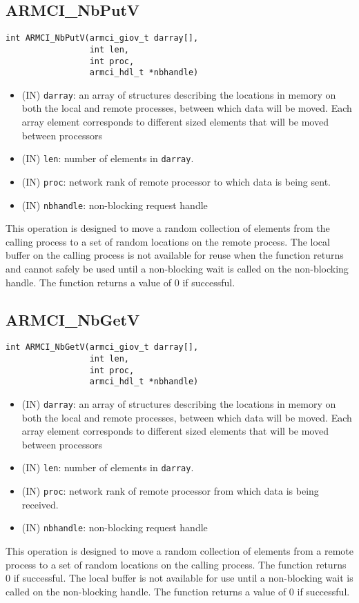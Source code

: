 \documentclass[12pt]{article}
\begin{document}
\subsection{ARMCI\_NbPutV}
\begin{verbatim}
int ARMCI_NbPutV(armci_giov_t darray[],
                 int len,
                 int proc,
                 armci_hdl_t *nbhandle)
\end{verbatim}
\begin{itemize}
\item (IN) \texttt{darray}: an array of structures describing the
locations in memory on both the local and remote processes, between which data
will be moved. Each array element corresponds to different sized elements that
will be moved between processors
\item (IN) \texttt{len}: number of elements in \texttt{darray}.
\item (IN) \texttt{proc}: network rank of remote processor to which data is
being sent.
\item (IN) \texttt{nbhandle}: non-blocking request handle
\end{itemize}
This operation is designed to move a random collection of elements from the
calling process to a set of random locations on the remote process.
The local buffer on the calling process is not available for reuse when
the function returns and cannot safely be used until a non-blocking wait is
called on the non-blocking handle. The function returns a value of 0 if
successful.

\subsection{ARMCI\_NbGetV}
\begin{verbatim}
int ARMCI_NbGetV(armci_giov_t darray[],
                 int len,
                 int proc,
                 armci_hdl_t *nbhandle)
\end{verbatim}
\begin{itemize}
\item (IN) \texttt{darray}: an array of structures describing the
locations in memory on both the local and remote processes, between which data
will be moved. Each array element corresponds to different sized elements that
will be moved between processors
\item (IN) \texttt{len}: number of elements in \texttt{darray}.
\item (IN) \texttt{proc}: network rank of remote processor from which data is
being received.
\item (IN) \texttt{nbhandle}: non-blocking request handle
\end{itemize}
This operation is designed to move a random collection of elements from a
remote process to a set of random locations on the calling process. The
function returns 0 if successful.  The local buffer is not available for use until
a non-blocking wait is called on the non-blocking handle. The
function returns a value of 0 if successful.
\end{document}
